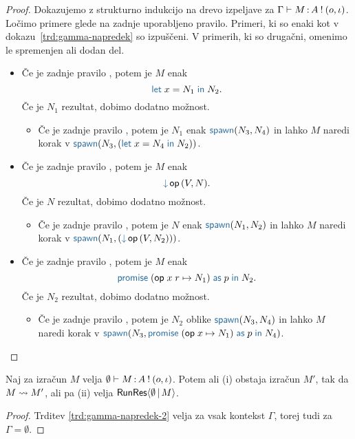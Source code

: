 \begin{proof}
	Dokazujemo z strukturno indukcijo na drevo izpeljave za $\Gamma \vdash M \mathinner{:} A \mathbin{!} (o, \iota)$.
	Ločimo primere glede na zadnje uporabljeno pravilo.
	Primeri, ki so enaki kot v dokazu~\ref{trd:gamma-napredek} so izpuščeni. V primerih, ki so drugačni, omenimo le spremenjen ali dodan del.
	
	\begin{itemize}
		\item Če je zadnje pravilo , potem je $M$ enak $$\tmlet{x}{N_1}{N_2}.$$
		Če je $N_1$ rezultat, dobimo dodatno možnost.
		\begin{itemize}
			\item Če je zadnje pravilo , potem je $N_1$ enak $\tmspawn{N_3}{N_4}$ in lahko $M$ naredi korak v $\tmspawn{N_3}{(\tmlet{x}{N_4}{N_2})}$.
		\end{itemize}
		
		\item Če je zadnje pravilo , potem je $M$ enak $$\tmopin{op}{V}{N}.$$
		Če je $N$ rezultat, dobimo dodatno možnost.
		\begin{itemize}
			\item Če je zadnje pravilo , potem je $N$ enak $\tmspawn{N_1}{N_2}$ in lahko $M$ naredi korak v $\tmspawn{N_1}{(\tmopin{op}{V}{N_2})}$.
		\end{itemize}
		
		
		\item Če je zadnje pravilo , potem je $M$ enak $$\tmwithrec{op}{x}{r}{N_1}{p}{N_2}.$$
		Če je $N_2$ rezultat, dobimo dodatno možnost.
		\begin{itemize}
			\item Če je zadnje pravilo , potem je $N_2$ oblike $\tmspawn{N_3}{N_4}$ in lahko $M$ naredi korak v $\tmspawn{N_3}{\tmwith{op}{x}{N_1}{p}{N_4}}$.
		\end{itemize}		
	\end{itemize}	
\end{proof}


\begin{posledica}[o napredku]\label{pos:prazen-napredek-2}
	Naj za izračun $M$ velja $\emptyset \vdash M \mathinner{:} A \mathbin{!} (o, \iota)$. Potem ali (i) obstaja izračun $M'$, tak da $M \leadsto M'$, ali pa (ii) velja $\mathsf{RunRes}\langle\emptyset \,\vert\, M\rangle$.
\end{posledica}

\begin{proof}
	Trditev \ref{trd:gamma-napredek-2} velja za vsak kontekst $\Gamma$, torej tudi za $\Gamma = \emptyset$.
\end{proof}


